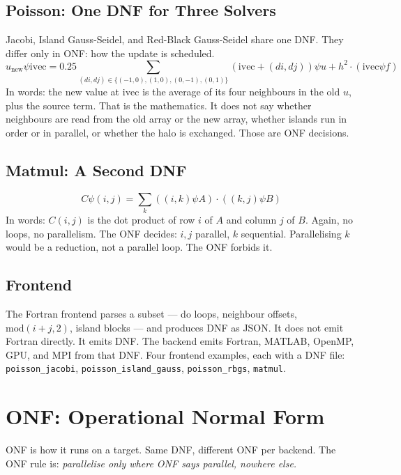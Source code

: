 \documentclass[11pt]{article}
\begin{document}
\subsection{Poisson: One DNF for Three Solvers}
Jacobi, Island Gauss-Seidel, and Red-Black Gauss-Seidel share one DNF.
They differ only in ONF: how the update is scheduled.
\begin{equation}
u_{\mathrm{new}} \psi \mathrm{ivec} = 0.25 \sum_{(di,dj) \in \{(-1,0),(1,0),(0,-1),(0,1)\}} (\mathrm{ivec}+(di,dj)) \psi u + h^2 \cdot (\mathrm{ivec} \psi f)
\label{eq:poisson-dnf}
\end{equation}
In words: the new value at $\mathrm{ivec}$ is the average of its four
neighbours in the old $u$, plus the source term. That is the mathematics.
It does not say whether neighbours are read from the old array or the new
array, whether islands run in order or in parallel, or whether the halo is
exchanged. Those are ONF decisions.

\subsection{Matmul: A Second DNF}
\begin{equation}
C \psi (i,j) = \sum_k ((i,k) \psi A) \cdot ((k,j) \psi B)
\label{eq:matmul-dnf}
\end{equation}
In words: $C(i,j)$ is the dot product of row $i$ of $A$ and column $j$ of $B$.
Again, no loops, no parallelism. The ONF decides: $i,j$ parallel, $k$
sequential. Parallelising $k$ would be a reduction, not a parallel loop.
The ONF forbids it.

\subsection{Frontend}
The Fortran frontend parses a subset --- do loops, neighbour offsets,
$\mathrm{mod}(i+j,2)$, island blocks --- and produces DNF as JSON.
It does not emit Fortran directly. It emits DNF. The backend emits Fortran,
MATLAB, OpenMP, GPU, and MPI from that DNF. Four frontend examples, each
with a DNF file: \texttt{poisson\_jacobi}, \texttt{poisson\_island\_gauss},
\texttt{poisson\_rbgs}, \texttt{matmul}.

\section{ONF: Operational Normal Form}
ONF is how it runs on a target. Same DNF, different ONF per backend.
The ONF rule is: \emph{parallelise only where ONF says parallel, nowhere else.}
\end{document}
